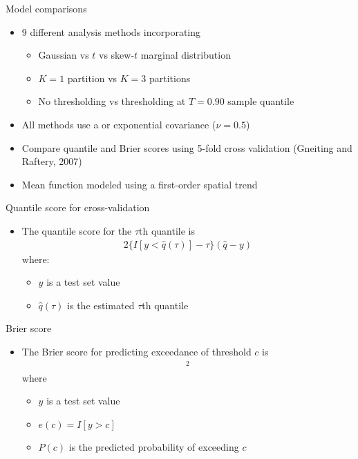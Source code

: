 \documentclass{beamer}
\begin{document}
\begin{frame}{Model comparisons}
  \begin{itemize} \setlength{\itemsep}{0.5em}
    \item 9 different analysis methods incorporating
    \begin{itemize}
      \item Gaussian vs $t$ vs skew-$t$ marginal distribution
      \item $K=1$ partition vs $K=3$ partitions
      \item No thresholding vs thresholding at $T=0.90$ sample quantile
    \end{itemize}
    \item All methods use a \Matern or exponential covariance ($\nu = 0.5$)
    \item Compare quantile and Brier scores using 5-fold cross validation (Gneiting and Raftery, 2007)
    \item Mean function modeled using a first-order spatial trend
  \end{itemize}
\end{frame}

\begin{frame}{Quantile score for cross-validation}
  \begin{itemize} \setlength{\itemsep}{0.5em}
    \item The quantile score for the $\tau$th quantile is
    \begin{align*}
      2 \{ I[y < \widehat{q}(\tau)] - \tau\} (\widehat{q} - y)
    \end{align*}
    where:
    \begin{itemize}
      \item $y$ is a test set value
      \item $\widehat{q}(\tau)$ is the estimated $\tau$th quantile
    \end{itemize}
  \end{itemize}
\end{frame}

\begin{frame}{Brier score}
  \begin{itemize} \setlength{\itemsep}{0.5em}
	\item The Brier score for predicting exceedance of threshold $c$ is
	\begin{align*}
	  [e(c) - P(c)]^2
	\end{align*}
	where 
	\begin{itemize}
		\item $y$ is a test set value
		\item $e(c) = I[y > c]$
		\item $P(c)$ is the predicted probability of exceeding $c$
	\end{itemize}
  \end{itemize}
\end{frame}
\end{document}
